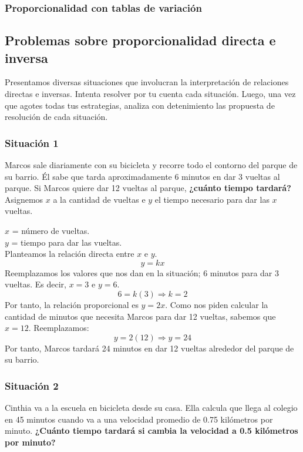 \documentclass[11pt]{book}
\begin{document}
\subsubsection{Proporcionalidad con tablas de variación}
\subsection{Problemas sobre proporcionalidad directa e inversa}

Presentamos diversas situaciones que involucran la interpretación de relaciones directas e inversas.
Intenta resolver por tu cuenta cada situación. Luego, una vez que agotes todas tus estrategias, analiza con detenimiento las propuesta de resolución de cada situación.

\subsubsection{Situación 1}

Marcos sale diariamente con su bicicleta y recorre todo el contorno del parque de su barrio. Él sabe que tarda aproximadamente 6 minutos en dar 3 vueltas al parque.
Si Marcos quiere dar 12 vueltas al parque,
\textbf{¿cuánto tiempo tardará?}\\

Asignemos $x$ a la cantidad de vueltas e $y$ el tiempo necesario para dar las $x$ vueltas.

$x$ = n\'umero de vueltas.\\
$y$ = tiempo para dar las vueltas.\\

Planteamos la relación directa entre $x$ e $y$.
\[y=kx\]
Reemplazamos los valores que nos dan en la situación; 6 minutos para dar 3 vueltas. Es decir, $x=3$ e $y=6$.
\[6=k(3) \Rightarrow k=2\]
Por tanto, la relación proporcional es $y=2x$.
Como nos piden calcular la cantidad de minutos que necesita Marcos para dar 12 vueltas, sabemos que $x=12$.
Reemplazamos:
\[y=2(12) \Rightarrow y=24\]
Por tanto, Marcos tardará 24 minutos en dar 12 vueltas alrededor del parque de su barrio.
\subsubsection{Situación 2}
Cinthia va a la escuela en bicicleta desde su casa. Ella calcula que llega al colegio en 45 minutos cuando va a una velocidad promedio de 0.75 kilómetros por minuto.
\textbf{¿Cuánto tiempo tardará si cambia la velocidad a 0.5 kilómetros por minuto?}
\end{document}
